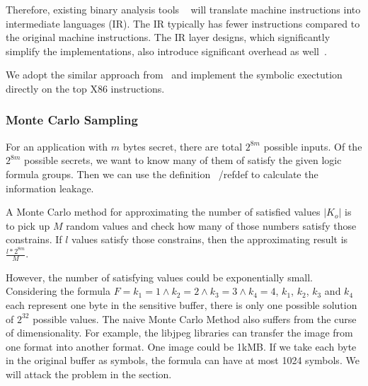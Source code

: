 Therefore, existing binary analysis tools ~\cite{shoshitaishvili2016state, 10.1007/978-3-642-22110-1_37} 
will translate machine instructions into intermediate languages (IR). The IR typically has fewer 
instructions compared to the original machine instructions. The IR layer designs, which significantly
simplify the implementations, also introduce significant overhead as well~\cite{217563}.

We adopt the similar approach from~\cite{217563} and implement the symbolic exectution directly on
the top X86 instructions.

\subsubsection{Monte Carlo Sampling}
For an application with $m$ bytes secret, there are total $2^{8m}$ possible inputs. Of the
$2^{8m}$ possible secrets, we want to know many of them of satisfy the given logic formula groups.
Then we can use the definition ~/ref{def} to calculate the information leakage.

A Monte Carlo method for approximating the number of satisfied values $|K_o|$ is to pick up 
$M$ random values and check how many of those numbers satisfy those constrains. If $l$ values
satisfy those constrains, then the approximating result is $\frac{l*2^{8m}}{M}$.

However, the number of satisfying values could be exponentially small. Considering the formula
$F={k_1} = 1\land{k_2} = 2\land{k_3} = 3\land{k_4} = 4$, $k_1$, $k_2$, $k_3$ and $k_4$ each represent
one byte in the sensitive buffer, there is only one possible solution of $2^{32}$ possible
values. The naive Monte Carlo Method also suffers from the curse of dimensionality. For example, 
the libjpeg libraries can transfer the image from one format into another format. One image could
be 1kMB. If we take each byte in the original buffer as symbols, the formula can have at most
1024 symbols. We will attack the problem in the section.
